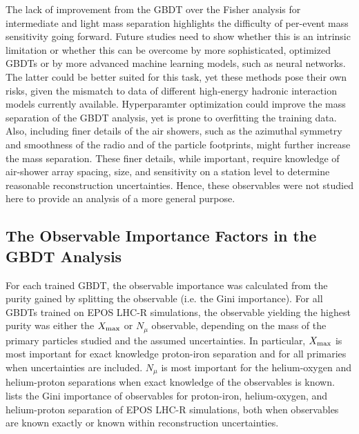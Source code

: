The lack of improvement from the GBDT over the Fisher analysis for intermediate and light mass separation highlights the difficulty of per-event mass sensitivity going forward.
Future studies need to show whether this is an intrinsic limitation or whether this can be overcome by more sophisticated, optimized GBDTs or by more advanced machine learning models, such as neural networks.
The latter could be better suited for this task, yet these methods pose their own risks, given the mismatch to data of different high-energy hadronic interaction models currently available.
Hyperparamter optimization could improve the mass separation of the GBDT analysis, yet is prone to overfitting the training data.
Also, including finer details of the air showers, such as the azimuthal symmetry and smoothness of the radio and of the particle footprints, might further increase the mass separation.
These finer details, while important, require knowledge of air-shower array spacing, size, and sensitivity on a station level to determine reasonable reconstruction uncertainties.  
Hence, these observables were not studied here to provide an analysis of a more general purpose.

\subsection{The Observable Importance Factors in the GBDT Analysis}\label{ssec:importances}
For each trained GBDT, the observable importance was calculated from the purity gained by splitting the observable (i.e. the Gini importance).
For all GBDTs trained on EPOS LHC-R simulations, the observable yielding the highest purity was either the $X_{\rm max}$ or $N_{\mu}$ observable, depending on the mass of the primary particles studied and the assumed uncertainties.
In particular, $X_{\rm max}$ is most important for exact knowledge proton-iron separation and for all primaries when uncertainties are included.
$N_{\mu}$ is most important for the helium-oxygen and helium-proton separations when exact knowledge of the observables is known.
 lists the Gini importance of observables for proton-iron, helium-oxygen, and helium-proton separation of EPOS LHC-R simulations, both when observables are known exactly or known within reconstruction uncertainties.

